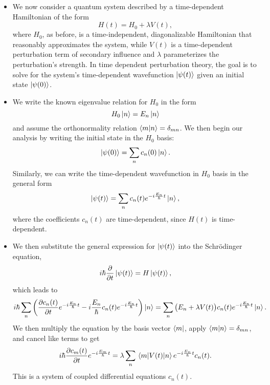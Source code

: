 \documentclass[11pt, a4paper]{article}
\newcommand{\Schro}{Schr\"{o}dinger\xspace}
\newcommand{\Ham}{Hamiltonian\xspace}
\newcommand{\p}{\psi}  %
\begin{document}
\begin{itemize}
    \item We now consider a quantum system described by a time-dependent \Ham of the form
    \begin{equation*}
        H(t) = H_{0} + \lambda V(t),
    \end{equation*}
    where $ H_{0} $, as before, is a time-independent, diagonalizable \Ham that reasonably approximates the system, while $ V(t) $ is a time-dependent perturbation term of secondary influence and $ \lambda $ parameterizes the perturbation's strength. In time dependent perturbation theory, the goal is to solve for the system's time-dependent wavefunction $ \ket{\psi(t)} $ given an initial state $ \ket{\psi(0)} $.

    \item We write the known eigenvalue relation for $ H_{0} $ in the form
    \begin{equation*}
        H_{0} \ket{n} = E_{n} \ket{n}
    \end{equation*}
    and assume the orthonormality relation $ \braket{m}{n} = \delta_{mn} $. We then begin our analysis by writing the initial state in the $ H_{0} $ basis:
    \begin{equation*}
        \ket{\p(0)} = \sum_{n}c_{n}(0)\ket{n}.
    \end{equation*}
    Similarly, we can write the time-dependent wavefunction in $ H_{0} $ basis in the general form
    \begin{equation*}
        \ket{\psi(t)} = \sum_{n}c_{n}(t)e^{-i \frac{E_{n}}{\hbar}t}\ket{n},
    \end{equation*}
    where the coefficients $ c_{n}(t) $ are time-dependent, since $ H(t) $ is time-dependent. 

    \item We then substitute the general expression for $ \ket{\p(t)} $ into the \Schro equation,
    \begin{equation*}
        i \hbar \pdv{t}\ket{\psi(t)} = H \ket{\psi(t)},
    \end{equation*}
    which leads to
    \begin{equation*}
        i \hbar \sum_{n}\left( \pdv{c_{n}(t)}{t}e^{-i \frac{E_{n}}{\hbar}t} - i \frac{E_{n}}{\hbar}c_{n}(t)e^{-i \frac{E_{n}}{\hbar}t} \right)\ket{n} = \sum_{n}\big( E_{n} + \lambda V(t) \big)c_{n}(t)e^{-i \frac{E_{n}}{\hbar}t} \ket{n}.
    \end{equation*}
    We then multiply the equation by the basis vector $ \bra{m} $, apply $ \braket{m}{n} = \delta_{mn} $, and cancel like terms to get
    \begin{equation*}
        i \hbar \pdv{c_{m}(t)}{t}e^{-i \frac{E_{m}}{\hbar}t} = \lambda \sum_{n} \mel{m}{V(t)}{n}e^{-i \frac{E_{n}}{\hbar}t} c_{n}(t).
    \end{equation*}
    This is a system of coupled differential equations $ c_{n}(t) $.


\end{itemize}
\end{document}
